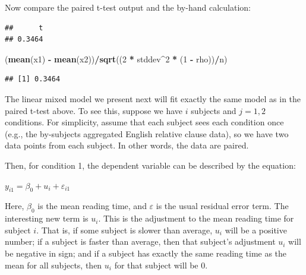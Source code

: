 \documentclass[12pt,]{krantz}
\newenvironment{Shaded}{\begin{snugshade}}{\end{snugshade}}
\newcommand{\DataTypeTok}[1]{\textcolor[rgb]{0.13,0.29,0.53}{#1}}
\newcommand{\DecValTok}[1]{\textcolor[rgb]{0.00,0.00,0.81}{#1}}
\newcommand{\KeywordTok}[1]{\textcolor[rgb]{0.13,0.29,0.53}{\textbf{#1}}}
\newcommand{\NormalTok}[1]{#1}
\newcommand{\OperatorTok}[1]{\textcolor[rgb]{0.81,0.36,0.00}{\textbf{#1}}}
\newcommand{\OtherTok}[1]{\textcolor[rgb]{0.56,0.35,0.01}{#1}}
\newcommand{\StringTok}[1]{\textcolor[rgb]{0.31,0.60,0.02}{#1}}
\begin{document}
Now compare the paired t-test output and the by-hand calculation:

\begin{Shaded}
\end{Shaded}

\begin{verbatim}
##      t 
## 0.3464
\end{verbatim}

\begin{Shaded}
\begin{Highlighting}[]
\NormalTok{(}\KeywordTok{mean}\NormalTok{(x1) }\OperatorTok{-}\StringTok{ }\KeywordTok{mean}\NormalTok{(x2))}\OperatorTok{/}\KeywordTok{sqrt}\NormalTok{((}\DecValTok{2} \OperatorTok{*}\StringTok{ }\NormalTok{stddev}\OperatorTok{^}\DecValTok{2} \OperatorTok{*}\StringTok{ }\NormalTok{(}\DecValTok{1} \OperatorTok{-}\StringTok{ }\NormalTok{rho))}\OperatorTok{/}\NormalTok{n)}
\end{Highlighting}
\end{Shaded}

\begin{verbatim}
## [1] 0.3464
\end{verbatim}

The linear mixed model we present next will fit exactly the same model as in the paired t-test above. To see this, suppose we have \(i\) subjects and \(j=1,2\) conditions. For simplicity, assume that each subject sees each condition once (e.g., the by-subjects aggregated English relative clause data), so we have two data points from each subject. In other words, the data are paired.

Then, for condition 1, the dependent variable can be described by the equation:

\(y_{i1} = \beta_0 + u_i + \varepsilon_{i1}\)

Here, \(\beta_0\) is the mean reading time, and \(\varepsilon\) is the usual residual error term. The interesting new term is \(u_i\). This is the adjustment to the mean reading time for subject \(i\). That is, if some subject is slower than average, \(u_i\) will be a positive number; if a subject is faster than average, then that subject's adjustment \(u_i\) will be negative in sign; and if a subject has exactly the same reading time as the mean for all subjects, then \(u_i\) for that subject will be 0.
\end{document}
